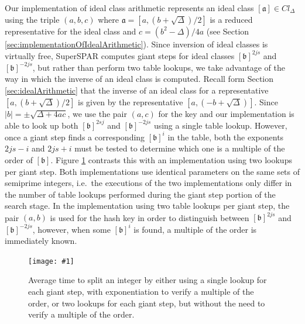 \documentclass{ucalgthes1}
\theoremstyle{definition}
\newcommand{\ideal}{\mathfrak}
\newcommand{\idealclass}[1]{\left[ \ideal #1 \right]}
\newcommand{\aclass}{\idealclass a}
\newcommand{\bclass}{\idealclass b}
\newcommand{\mygraphX}[4]{
	\begin{figure}[htb]
	\centering
	\texttt{[image: \#1]}
	\caption[#4]{#3}
	\label{#2}
	\end{figure}
}
\begin{document}
Our implementation of ideal class arithmetic represents an ideal class $\aclass \in Cl_\Delta$ using the triple $(a, b, c)$ where $\ideal a = [a, (b + \sqrt\Delta)/2]$ is a reduced representative for the ideal class and $c = (b^2 - \Delta)/4a$ (see Section \ref{sec:implementationOfIdealArithmetic}).  Since inversion of ideal classes is virtually free, SuperSPAR computes giant steps for ideal classes $\bclass^{2js}$ and $\bclass^{-2js}$, but rather than perform two table lookups, we take advantage of the way in which the inverse of an ideal class is computed.  Recall form Section \ref{sec:idealArithmetic} that the inverse of an ideal class for a representative $[a, (b + \sqrt\Delta)/2]$ is given by the representative $[a, (-b + \sqrt\Delta)]$.  Since $|b| = \pm \sqrt{\Delta +4ac}$, we use the pair $(a, c)$ for the key and our implementation is able to look up both $\bclass^{2sj}$ and $\bclass^{-2js}$ using a single table lookup.  However, once a giant step finds a corresponding $\bclass^i$ in the table, both the exponents $2js-i$ and $2js+i$ must be tested to determine which one is a multiple of the order of $\bclass$.  Figure \ref{fig:ssparSingleLookup} contrasts this with an implementation using two lookups per giant step.  Both implementations use identical parameters on the same sets of semiprime integers, i.e.\ the executions of the two implementations only differ in the number of table lookups performed during the giant step portion of the search stage.  In the implementation using two table lookups per giant step, the pair $(a, b)$ is used for the hash key in order to distinguish between $\bclass^{2js}$ and $\bclass^{-2js}$, however, when some $\bclass^i$ is found, a multiple of the order is immediately known.

\mygraphX{hashing-single-vs-double}{fig:ssparSingleLookup}{Average time to split an integer by either using a single lookup for each giant step, with exponentiation to verify a multiple of the order, or two lookups for each giant step, but without the need to verify a multiple of the order.}{Inversion aware hashing.}
\end{document}
